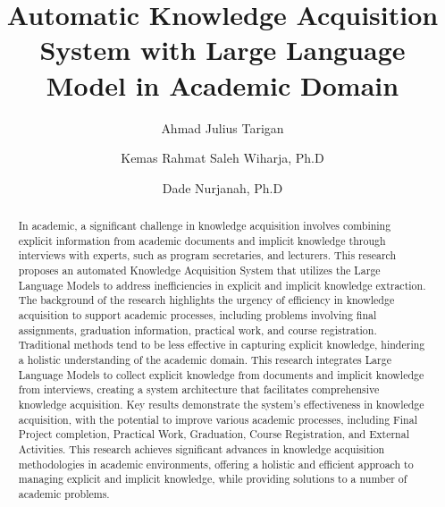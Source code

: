 \documentclass[runningheads]{llncs}
\begin{document}
%
\title{Automatic Knowledge Acquisition System with Large Language Model in Academic Domain}
%
%
\author{Ahmad Julius Tarigan \and
Kemas Rahmat Saleh Wiharja, Ph.D \and
Dade Nurjanah, Ph.D}
%
%
%
\maketitle              %
%
\begin{abstract}
In academic, a significant challenge in knowledge acquisition involves combining explicit information from academic documents and implicit knowledge through interviews with experts, such as program secretaries, and lecturers. This research proposes an automated Knowledge Acquisition System that utilizes the Large Language Models to address inefficiencies in explicit and implicit knowledge extraction. The background of the research highlights the urgency of efficiency in knowledge acquisition to support academic processes, including problems involving final assignments, graduation information, practical work, and course registration. Traditional methods tend to be less effective in capturing explicit knowledge, hindering a holistic understanding of the academic domain. This research integrates Large Language Models to collect explicit knowledge from documents and implicit knowledge from interviews, creating a system architecture that facilitates comprehensive knowledge acquisition. Key results demonstrate the system's effectiveness in knowledge acquisition, with the potential to improve various academic processes, including Final Project completion, Practical Work, Graduation, Course Registration, and External Activities. This research achieves significant advances in knowledge acquisition methodologies in academic environments, offering a holistic and efficient approach to managing explicit and implicit knowledge, while providing solutions to a number of academic problems.

\end{abstract}
%
%
%
\end{document}
